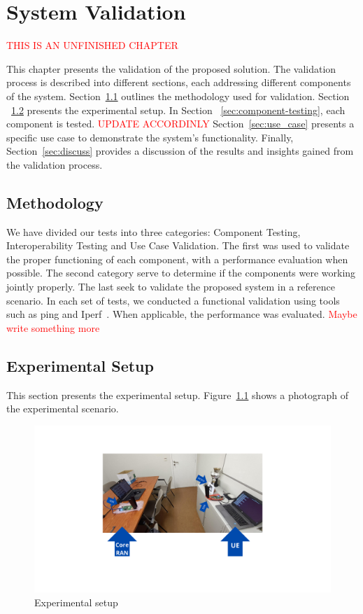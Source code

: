 \chapter{System Validation}\label{ch:validation}

\textcolor{red}{THIS IS AN UNFINISHED CHAPTER}

This chapter presents the validation of the proposed solution.
The validation process is described into different sections, each addressing different components of the system.
Section~\ref{sec:meth} outlines the methodology used for validation.
Section ~\ref{sec:experimental-setup} presents the experimental setup.
In Section ~\ref{sec:component-testing}, each component is tested.
\textcolor{red}{UPDATE ACCORDINLY}
Section~\ref{sec:use_case} presents a specific use case to demonstrate the system's functionality.
Finally, Section~\ref{sec:discuss} provides a discussion of the results and insights gained from the validation process.

\section{Methodology}\label{sec:meth}
We have divided our tests into three categories: Component Testing, Interoperability Testing and Use Case Validation.
The first was used to validate the proper functioning of each component, with a performance evaluation when possible.
The second category serve to determine if the components were working jointly properly.
The last seek to validate the proposed system in a reference scenario.
In each set of tests, we conducted a functional validation using tools such as ping and Iperf~\cite{iperf}.
When applicable, the performance was evaluated.
\textcolor{red}{Maybe write something more}

\section{Experimental Setup}\label{sec:experimental-setup}
This section presents the experimental setup.
Figure~\ref{fig:setup} shows a photograph of the experimental scenario.

\begin{figure}[H]
    \centering
    \includegraphics[width=\linewidth]{figures/setup}
    \caption{Experimental setup}
    \label{fig:setup}
\end{figure}


